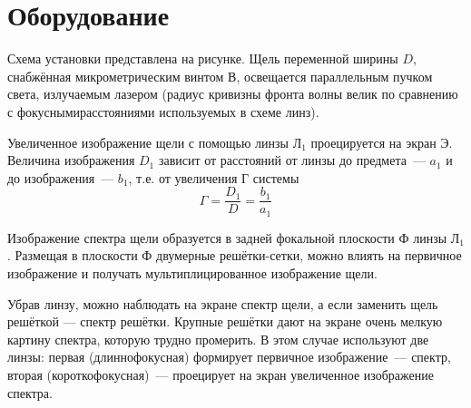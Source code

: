 \section{Оборудование}

\begin{figure}[ht!]
\end{figure}
Схема установки представлена на рисунке. Щель переменной ширины $D$,  снабжённая микрометрическим винтом В, освещается параллельным пучком света, излучаемым лазером (радиус кривизны фронта волны велик по сравнению с фокуснымирасстояниями используемых в схеме линз).

Увеличенное изображение щели с помощью линзы $\text{Л}_{1}$ проецируется на экран Э. Величина изображения $D_{1}$ зависит от расстояний от линзы до предмета~--- $a_{1}$ и до изображения~--- $b_{1}$, т.е. от увеличения Г системы
\[
    \Gamma = \frac{D_{1}}{D} = \frac{b_{1}}{a_{1}}
\]

Изображение спектра щели образуется в задней фокальной плоскости Ф линзы $\text{Л}_{1}$. Размещая в плоскости Ф двумерные решётки-сетки, можно влиять на первичное изображение и получать мультиплицированное изображение щели.

Убрав линзу, можно наблюдать на экране спектр щели, а если заменить щель решёткой — спектр решётки. Крупные решётки дают на экране очень мелкую картину спектра, которую трудно промерить. В этом случае используют две линзы: первая (длиннофокусная) формирует первичное изображение~--- спектр, вторая (короткофокусная)~--- проецирует на экран увеличенное изображение спектра.
